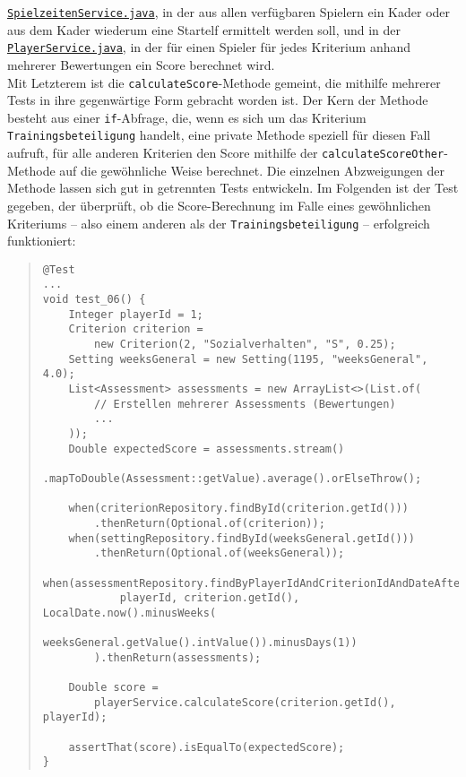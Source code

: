 \href{https://github.com/FlorianOhmes/bat_spielzeitenplaner/blob/main/spielzeitenplaner/src/main/java/de/bathesis/spielzeitenplaner/services/SpielzeitenService.java}{\texttt{SpielzeitenService.java}}, 
in der aus allen verfügbaren Spielern ein Kader oder aus dem Kader wiederum eine 
Startelf ermittelt werden soll, und in der 
\href{https://github.com/FlorianOhmes/bat_spielzeitenplaner/blob/main/spielzeitenplaner/src/main/java/de/bathesis/spielzeitenplaner/services/PlayerService.java}{\texttt{PlayerService.java}}, in der für einen Spieler 
für jedes Kriterium anhand mehrerer Bewertungen ein Score berechnet wird. \\ 
Mit Letzterem ist die \texttt{calculateScore}-Methode gemeint, die mithilfe mehrerer 
Tests in ihre gegenwärtige Form gebracht worden ist. Der Kern der Methode besteht 
aus einer \texttt{if}-Abfrage, die, wenn es sich um das Kriterium 
\texttt{Trainingsbeteiligung} handelt, eine private Methode speziell für diesen 
Fall aufruft, für alle anderen Kriterien den Score mithilfe der 
\texttt{calculateScoreOther}-Methode auf die gewöhnliche Weise berechnet. Die 
einzelnen Abzweigungen der Methode lassen sich gut in getrennten Tests entwickeln. 
Im Folgenden ist der Test gegeben, der überprüft, ob die Score-Berechnung im Falle 
eines gewöhnlichen Kriteriums -- also einem anderen als der 
\texttt{Trainingsbeteiligung} -- erfolgreich funktioniert: 

\begin{quote}
\begin{verbatim}
@Test
...
void test_06() {
    Integer playerId = 1;
    Criterion criterion = 
        new Criterion(2, "Sozialverhalten", "S", 0.25);
    Setting weeksGeneral = new Setting(1195, "weeksGeneral", 4.0);
    List<Assessment> assessments = new ArrayList<>(List.of(
        // Erstellen mehrerer Assessments (Bewertungen) 
        ... 
    ));
    Double expectedScore = assessments.stream()
        .mapToDouble(Assessment::getValue).average().orElseThrow();

    when(criterionRepository.findById(criterion.getId()))
        .thenReturn(Optional.of(criterion));
    when(settingRepository.findById(weeksGeneral.getId()))
        .thenReturn(Optional.of(weeksGeneral));
    when(assessmentRepository.findByPlayerIdAndCriterionIdAndDateAfter(
            playerId, criterion.getId(), LocalDate.now().minusWeeks(
                weeksGeneral.getValue().intValue()).minusDays(1))
        ).thenReturn(assessments);

    Double score = 
        playerService.calculateScore(criterion.getId(), playerId);

    assertThat(score).isEqualTo(expectedScore);
}
\end{verbatim}
\end{quote}

